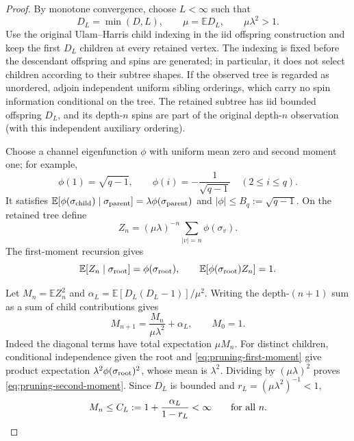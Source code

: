 \begin{proof}
By monotone convergence, choose $L<\infty$ such that
\[
 D_L=\min(D,L),\qquad \mu=\mathbb E D_L,
 \qquad \mu\lambda^2>1.
\]
Use the original Ulam--Harris child indexing in the iid offspring
construction and keep the first $D_L$ children at every retained vertex.
The indexing is fixed before the descendant offspring and spins are
generated; in particular, it does not select children according to their
subtree shapes. If the observed tree is regarded as unordered, adjoin
independent uniform sibling orderings, which carry no spin information
conditional on the tree. The retained subtree has iid bounded offspring
$D_L$, and its depth-$n$ spins are part of the original depth-$n$
observation (with this independent auxiliary ordering).

Choose a channel eigenfunction $\phi$ with uniform mean zero and second
moment one; for example,
\[
 \phi(1)=\sqrt{q-1},\qquad
 \phi(i)=-\frac1{\sqrt{q-1}}\quad(2\le i\le q).
\]
It satisfies
$\mathbb E[\phi(\sigma_{\rm child})\mid\sigma_{\rm parent}]
=\lambda\phi(\sigma_{\rm parent})$ and
$|\phi|\le B_q:=\sqrt{q-1}$.
On the retained tree define
\[
 Z_n=(\mu\lambda)^{-n}
       \sum_{|v|=n}\phi(\sigma_v).
\]
The first-moment recursion gives
\begin{equation}
 \mathbb E[Z_n\mid\sigma_{\rm root}]
 =\phi(\sigma_{\rm root}),\qquad
 \mathbb E[\phi(\sigma_{\rm root})Z_n]=1.
 \label{eq:pruning-first-moment}
\end{equation}

Let $M_n=\mathbb E Z_n^2$ and
$\alpha_L=\mathbb E[D_L(D_L-1)]/\mu^2$.  Writing the depth-$(n+1)$
sum as a sum of child contributions gives
\begin{equation}
 M_{n+1}=\frac{M_n}{\mu\lambda^2}+\alpha_L,
 \qquad M_0=1.
 \label{eq:pruning-second-moment}
\end{equation}
Indeed the diagonal terms have total expectation $\mu M_n$.  For distinct
children, conditional independence given the root and
\eqref{eq:pruning-first-moment} give product expectation
$\lambda^2\phi(\sigma_{\rm root})^2$, whose mean is $\lambda^2$.
Dividing by $(\mu\lambda)^2$ proves
\eqref{eq:pruning-second-moment}.  Since $D_L$ is bounded and
$r_L=(\mu\lambda^2)^{-1}<1$,
\[
 M_n\le C_L:=1+\frac{\alpha_L}{1-r_L}<\infty
 \qquad\hbox{for all }n.
\]


\end{proof}
